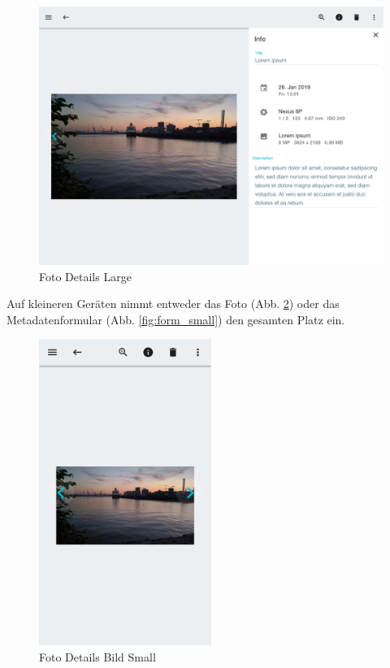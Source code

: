 \begin{figure}[htp]     %
\centering
\includegraphics[width=1.0\textwidth]{images/form_normal}
\caption{Foto Details Large}\label{fig:form_normal}
\end{figure}

Auf kleineren Geräten nimmt entweder das Foto (Abb. \ref{fig:details_small}) oder das Metadatenformular (Abb. \ref{fig:form_small}) den gesamten Platz ein.

\begin{figure}[htp]     %
\centering
\includegraphics[width=0.5\textwidth]{images/details_small}
\caption{Foto Details Bild Small}\label{fig:details_small}
\end{figure}

